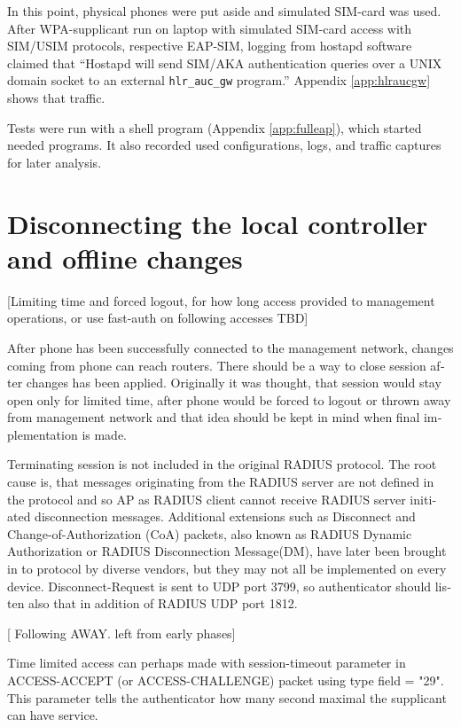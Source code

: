 \documentclass[12pt,a4paper,english]{tutthesis}
\begin{document}
\begin{otherlanguage}{english}
In this point, physical phones were put aside and simulated SIM-card
was used.
After WPA-supplicant run on laptop with simulated SIM-card access 
with SIM/USIM protocols, respective EAP-SIM, logging 
from hostapd software claimed that ``Hostapd will send SIM/AKA authentication
queries over a UNIX domain socket to an external \verb~hlr_auc_gw~ program.''
Appendix \ref{app:hlraucgw}   shows that traffic.

Tests were run with a shell program (Appendix \ref{app:fulleap}), which
started needed programs. It also recorded used configurations, logs,
and traffic captures for later analysis.

\section{Disconnecting the local controller and offline changes}
\label{sec-5-3}
\label{sec:disconnections}
[Limiting time and forced logout, for how long access provided to
management operations, or use fast-auth on following accesses TBD]

After phone has been successfully connected to the management network,
changes coming from 
phone can reach routers.  There should be a way to close session after
changes has been applied. Originally it was thought, that session
would stay open only for limited time, after phone would be forced to
logout or thrown away from management network and that idea should be
kept in mind when final implementation is made.



Terminating session is not included in the original RADIUS protocol.
The root cause is, that messages originating from the RADIUS server
are not defined in the protocol and so AP as RADIUS client cannot
receive RADIUS server initiated disconnection messages. Additional
extensions such as Disconnect and Change-of-Authorization (CoA)
packets, also known as RADIUS Dynamic Authorization or RADIUS
Disconnection Message(DM), have later been brought in \cite{rfc5176}
to protocol by diverse vendors, but they may not all be implemented on
every device.
Disconnect-Request is sent to UDP port 3799, so authenticator should
listen also that in addition of RADIUS UDP port 1812.






[ Following AWAY. left from early phases]

Time limited access can perhaps made with session-timeout parameter
in ACCESS-ACCEPT (or ACCESS-CHALLENGE) packet using type field = "29".
This parameter tells the authenticator how many second maximal the supplicant
can have service. 


\end{otherlanguage}
\end{document}

